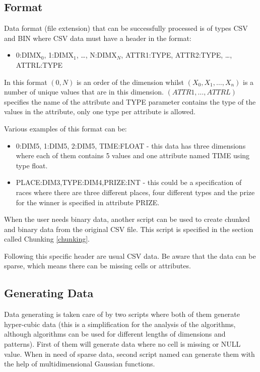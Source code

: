 \subsection{Format}\label{format}
Data format (file extension) that can be successfully processed is of types CSV and BIN where CSV data must have a header in the format:
\begin{itemize}
\item 0:DIMX$_0$, 1:DIMX$_1$, \ldots , N:DIMX$_N$, ATTR1:TYPE, ATTR2:TYPE, \ldots , ATTRL:TYPE
\end{itemize}
In this format $(0, N)$ is an order of the dimension whilst $(X_0, X_1, \ldots , X_n)$ is a number of unique values that are in this dimension. $(ATTR1, \ldots, ATTRL)$ specifies the name of the attribute and TYPE parameter contains the type of the values in the attribute, only one type per attribute is allowed. 

Various examples of this format can be: 
\begin{itemize}
\item 0:DIM5, 1:DIM5, 2:DIM5, TIME:FLOAT - this data has three dimensions where each of them contains 5 values and one attribute named TIME using type float.
\item PLACE:DIM3,TYPE:DIM4,PRIZE:INT - this could be a specification of races where there are three different places, four different types and the prize for the winner is specified in attribute PRIZE.
\end{itemize}

When the user needs binary data, another script can be used to create chunked and binary data from the original CSV file. This script is specified in the section called Chunking \ref{chunking}.

Following this specific header are usual CSV data. Be aware that the data can be sparse, which means there can be missing cells or attributes.

\subsection{Generating Data}\label{generating}
Data generating is taken care of by two scripts where both of them generate hyper-cubic data (this is a simplification for the analysis of the algorithms, although algorithms can be used for different lengths of dimensions and patterns). First of them will generate data where no cell is missing or NULL value.
When in need of sparse data, second script named can generate them with the help of multidimensional Gaussian functions. 

